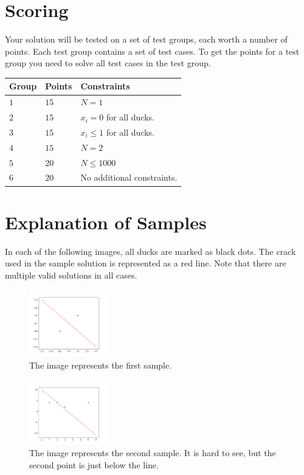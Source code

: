 \section*{Scoring}
Your solution will be tested on a set of test groups, each worth a number of points. Each test group contains
a set of test cases. To get the points for a test group you need to solve all test cases in the test group.

\noindent
\begin{tabular}{| l | l | p{12cm} |}
  \hline
  \textbf{Group} & \textbf{Points} & \textbf{Constraints} \\ \hline
  $1$    & $15$       & $N = 1$ \\ \hline
  $2$    & $15$       & $x_i = 0$ for all ducks. \\ \hline
  $3$    & $15$       & $x_i \leq 1$ for all ducks. \\ \hline
  $4$    & $15$       & $N = 2$ \\ \hline
  $5$    & $20$       & $N \leq 1000$ \\ \hline
  $6$    & $20$       & No additional constraints. \\ \hline
\end{tabular}

\section*{Explanation of Samples}
In each of the following images, all ducks are marked as black dots. The crack used in the sample solution is represented as a red line.
Note that there are multiple valid solutions in all cases.

\begin{centering}
  \begin{figure}[h]
      \centering
      \includegraphics[width=0.3\textwidth]{sample1.png}
      \caption{The image represents the first sample.}
      \label{fig:enter-label}
  \end{figure}
\end{centering}

\begin{centering}
  \begin{figure}[h]
      \centering
      \includegraphics[width=0.3\textwidth]{sample2.png}
      \caption{The image represents the second sample. It is hard to see, but the second point
      is just below the line.}
      \label{fig:enter-label}
  \end{figure}
\end{centering}

